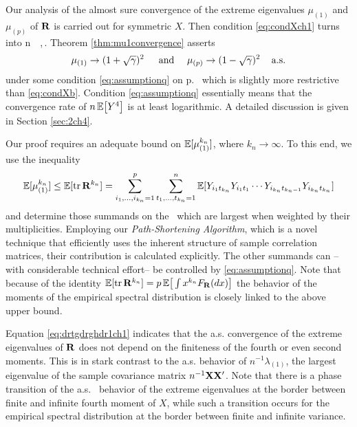 Our analysis of the almost sure convergence of the extreme eigenvalues $\mu_{(1)}$ and $\mu_{(p)}$ of ${\mathbf R}$ is carried out for symmetric $X$. Then condition \eqref{eq:condXch1} turns into 
\beam\label{eq:condXb}
n \, \E \big[ Y^4 \big] \,,\qquad \nto\,.
\eeam
Theorem \ref{thm:mu1convergence} asserts
\begin{equation}\label{eq:drtgdrghdr1ch1}
\mu_{(1)} \to (1+\sqrt{\gamma})^2\, \quad \text{ and } \quad  \mu_{(p)} \to (1-\sqrt{\gamma})^2\, \quad {\rm a.s.}
\end{equation}
under some condition \eqref{eq:assumptionq} on p.~\pageref{eq:assumptionq} which is slightly more restrictive than \eqref{eq:condXb}. Condition \eqref{eq:assumptionq} essentially means that the convergence rate of $n \, \mathbb{E} \big[ Y^4 \big]$ is at least logarithmic. A detailed discussion is given in Section \ref{sec:2ch4}.
\par

Our proof requires an adequate bound on $\mathbb{E}[\mu_{(1)}^{k_n}]$, where $k_n\to \infty$. To this end, we use the inequality
\begin{equation*}
\E[\mu_{(1)}^{k_n}]\le \E[\tr \bfR^{k_n}] %
= \sum_{i_1,\ldots,i_{k_n}=1}^p \sum_{t_1,\ldots,t_{k_n}=1}^n \E[ Y_{i_1t_{k_n}} Y_{i_1t_1}  \cdots Y_{i_{k_n}t_{{k_n}-1}} Y_{i_{k_n}t_{k_n}}  ]
\end{equation*}
and determine those summands on the \rhs~which are largest when weighted by their multiplicities. Employing our {\em Path-Shortening Algorithm}, which is a novel technique that efficiently uses the inherent structure of sample correlation matrices, their contribution is calculated explicitly. The other summands can --with considerable technical effort-- be controlled by \eqref{eq:assumptionq}. 
Note that because of the identity $\mathbb{E}[\operatorname{tr} {\mathbf R}^{k_n}] =p\, \mathbb{E}\big[\int x^{k_n} F_{{\mathbf R}}(dx)\big]$ the behavior of the moments of the empirical spectral distribution is closely linked to the above upper bound.

Equation \eqref{eq:drtgdrghdr1ch1} indicates that the a.s. convergence of the extreme eigenvalues of ${\mathbf R}$
does not depend on the finiteness of the fourth or even second moments. 
This is in stark contrast to the a.s. behavior of $n^{-1}\lambda_{(1)}$, the largest eigenvalue of the sample covariance matrix 
$n^{-1}{\mathbf X}{\mathbf X}'$. Note that there is a phase transition of the a.s. \asy\ behavior of the  
extreme eigenvalues at the border between finite and infinite fourth moment of $X$, 
while such a transition occurs for the empirical spectral distribution at the border between finite and infinite variance.
\par

